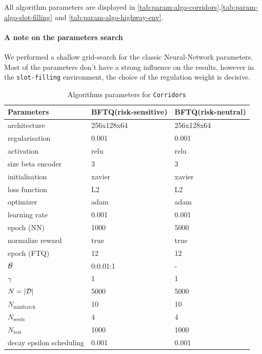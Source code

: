 All algorithm parameters are displayed in \autoref{tab:param-algo-corridors},\autoref{tab:param-algo-slot-filling} and \autoref{tab:param-algo-highway-env}.

\paragraph{A note on the parameters search}

We performed a shallow grid-search for the classic Neural-Network parameters. Most of the parameters don't have a strong influence on the results, however in the \texttt{slot-filling} environment, the choice of the regulation weight is decisive.

\begin{table}[tp]
    \centering
    \begin{tabular}{lll}
        \toprule
        Parameters & BFTQ(risk-sensitive) & BFTQ(risk-neutral)\tabularnewline
        \midrule
        architecture & 256x128x64 & 256x128x64\tabularnewline
        regularisation & 0.001 & 0.001\tabularnewline
        activation & relu & relu\tabularnewline
        size beta encoder & 3 & 3\tabularnewline
        initialisation & xavier & xavier\tabularnewline
        loss function & L2 & L2\tabularnewline
        optimizer & adam & adam\tabularnewline
        learning rate & 0.001 & 0.001\tabularnewline
        epoch (NN) & 1000 & 5000\tabularnewline
        normalize reward & true & true\tabularnewline
        epoch (FTQ) & 12 & 12\tabularnewline
        $\tilde{\mathcal{B}}$ & 0:0.01:1 & -\tabularnewline
        $\gamma$ & 1 & 1\tabularnewline
        $N=|\mathcal{D}|$ & 5000 & 5000\tabularnewline
        $N_\text{minibatch}$ & 10 & 10\tabularnewline
        $N_\text{seeds}$ & 4 & 4\tabularnewline
        $N_\text{test}$ & 1000 & 1000\tabularnewline
        decay epsilon scheduling & 0.001 & 0.001\tabularnewline
        \bottomrule
    \end{tabular}
    \caption{Algorithms parameters for \texttt{Corridors}}
    \label{tab:param-algo-corridors}
\end{table}

